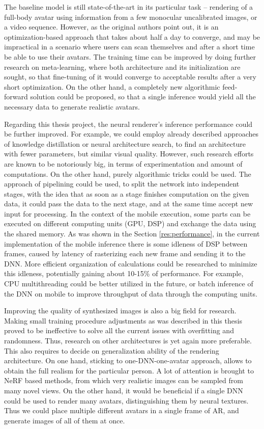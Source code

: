 The baseline model \cite{dnn:stylepeople21} is still state-of-the-art in its particular task -- rendering of a full-body avatar using information from a few monocular uncalibrated images, or a video sequence. However, as the original authors point out, it is an optimization-based approach that takes about half a day to converge, and may be impractical in a scenario where users can scan themselves and after a short time be able to use their avatars. The training time can be improved by doing further research on meta-learning, where both architecture and its initialization are sought, so that fine-tuning of it would converge to acceptable results after a very short optimization. On the other hand, a completely new algorithmic feed-forward solution could be proposed, so that a single inference would yield all the necessary data to generate realistic avatars.

Regarding this thesis project, the neural renderer's inference performance could be further improved. For example, we could employ already described approaches of knowledge distillation or neural architecture search, to find an architecture with fewer parameters, but similar visual quality. However, such research efforts are known to be notoriously big, in terms of experimentation and amount of computations. On the other hand, purely algorithmic tricks could be used. The approach of pipelining \cite{mobile:pipelining20} could be used, to split the network into independent stages, with the idea that as soon as a stage finishes computation on the given data, it could pass the data to the next stage, and at the same time accept new input for processing. In the context of the mobile execution, some parts can be executed on different computing units (GPU, DSP) and exchange the data using the shared memory. As was shown in the Section \ref{res:performance}, in the current implementation of the mobile inference there is some idleness of DSP between frames, caused by latency of rasterizing each new frame and sending it to the DNN. More efficient organization of calculations could be researched to minimize this idleness, potentially gaining about 10-15\% of performance. For example, CPU multithreading could be better utilized in the future, or batch inference of the DNN on mobile to improve throughput of data through the computing units.

Improving the quality of synthesized images is also a big field for research. Making small training procedure adjustments as was described in this thesis proved to be ineffective to solve all the current issues with overfitting and randomness. Thus, research on other architectures is yet again more preferable. This also requires to decide on generalization ability of the rendering architecture. On one hand, sticking to one-DNN-one-avatar approach, allows to obtain the full realism for the particular person. A lot of attention is brought to NeRF \cite{dnn:nerf20, dnn:phorhum22} based methods, from which very realistic images can be sampled from many novel views. On the other hand, it would be beneficial if a single DNN could be used to render many avatars, distinguishing them by neural textures. Thus we could place multiple different avatars in a single frame of AR, and generate images of all of them at once. 

